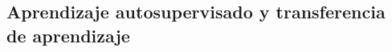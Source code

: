 \documentclass[11pt,spanish,listoffigures,listoftables]{tfgetsinf}
\begin{document}




\subsection{Aprendizaje autosupervisado y transferencia de aprendizaje}
\end{document}
